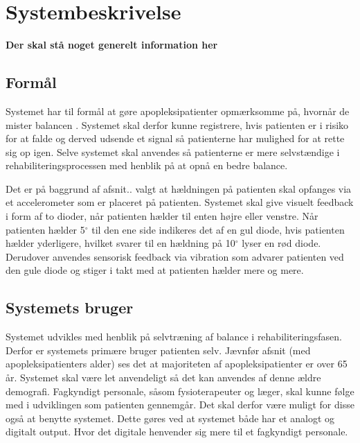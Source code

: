 \section{Systembeskrivelse}  
\textbf{Der skal stå noget generelt information her}

\subsection{Formål}

Systemet har til formål at gøre apopleksipatienter opmærksomme på, hvornår de mister balancen . Systemet skal derfor kunne registrere, hvis patienten er i risiko for at falde og derved udsende et signal så patienterne har mulighed for at rette sig op igen. Selve systemet skal anvendes så patienterne er mere selvstændige i rehabiliteringsprocessen med henblik på at opnå en bedre balance. 

Det er på baggrund af afsnit.. valgt at hældningen på patienten skal opfanges via et accelerometer som er placeret på patienten. Systemet skal give visuelt feedback i form af to dioder, når patienten hælder til enten højre eller venstre. Når patienten hælder 5$^{\circ}$ til den ene side indikeres det af en gul diode, hvis patienten hælder yderligere, hvilket svarer til en hældning på 10$^{\circ}$ lyser en rød diode. Derudover anvendes sensorisk feedback via vibration som advarer patienten ved den gule diode og stiger i takt med at patienten hælder mere og mere.  

\subsection{Systemets bruger}
Systemet udvikles med henblik på selvtræning af balance i rehabiliteringsfasen. Derfor er systemets primære bruger patienten selv. Jævnfør afsnit (med apopleksipatienters alder) ses det at majoriteten af apopleksipatienter er over 65 år. Systemet skal være let anvendeligt så det kan anvendes af denne ældre demografi. Fagkyndigt personale, såsom fysioterapeuter og læger, skal kunne følge med i udviklingen som patienten gennemgår. Det skal derfor være muligt for disse også at benytte systemet. Dette gøres ved at systemet både har et analogt og digitalt output. Hvor det digitale henvender sig mere til et fagkyndigt personale.

